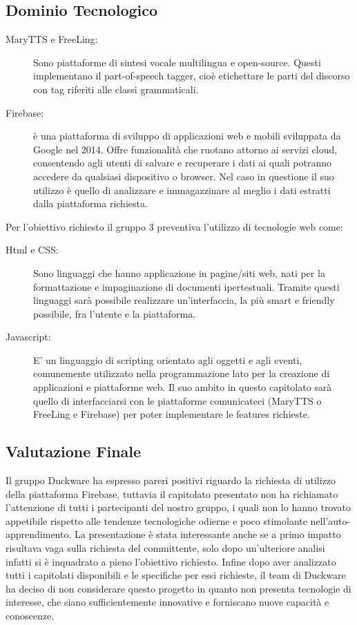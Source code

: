 \subsection{Dominio Tecnologico}
\begin{description}
\item[MaryTTS e FreeLing:] Sono piattaforme di sintesi vocale multilingua e open-source. Questi  implementano il part-of-speech tagger, cioè etichettare le parti del discorso con tag riferiti alle classi grammaticali.

\item[Firebase:] è una piattaforma di sviluppo di applicazioni web e mobili sviluppata da Google nel 2014. Offre funzionalità che ruotano attorno ai servizi cloud, consentendo agli utenti di salvare e recuperare i dati ai quali potranno accedere da qualsiasi dispositivo o browser. Nel caso in questione il suo utilizzo è quello di analizzare e immagazzinare al meglio i dati estratti dalla piattaforma richiesta.
\end{description}

Per l'obiettivo richiesto il gruppo 3 preventiva l'utilizzo di tecnologie web come:
\begin{description}		
		\item[Html e CSS:] Sono linguaggi che hanno applicazione in pagine/siti web, nati per la formattazione e impaginazione di documenti ipertestuali. Tramite questi linguaggi sarà possibile realizzare un'interfaccia, la più smart e friendly possibile, fra l'utente e la piattaforma.

		\item[Javascript:] E' un linguaggio di scripting orientato agli oggetti e agli eventi, comunemente utilizzato nella programmazione lato  per la creazione di applicazioni e piattaforme web. Il suo ambito in questo capitolato sarà quello di interfacciarsi con le piattaforme comunicateci (MaryTTS o FreeLing e Firebase) per poter implementare le features richieste.
\end{description}

\subsection{Valutazione Finale}
Il gruppo Duckware ha espresso pareri positivi riguardo la richiesta di utilizzo della piattaforma Firebase, tuttavia il capitolato presentato non ha richiamato l'attenzione di tutti i partecipanti del nostro gruppo, i quali non lo hanno trovato appetibile rispetto alle tendenze tecnologiche odierne e poco stimolante nell'auto-apprendimento.
La presentazione è stata interessante anche se a primo impatto risultava vaga sulla richiesta del committente, solo dopo un'ulteriore analisi infatti si è inquadrato a pieno l'obiettivo richiesto.
Infine dopo aver analizzato tutti i capitolati disponibili e le specifiche per essi richieste, il team di Duckware ha deciso di non considerare questo progetto in quanto non presenta tecnologie di interesse, che siano sufficientemente innovative e forniscano nuove capacità e conoscenze.
